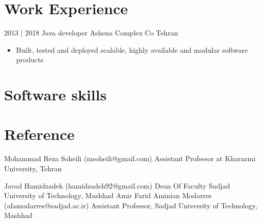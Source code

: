 \documentclass[letterpaper]{moderncv}        %
\begin{document}
\section{Work Experience}
\cventry
{2013 | 2018}
{Java developer}
{Ashena Complex Co}
{Tehran}
{}
{\begin{itemize}%
	\item Built, tested and deployed scalable, highly available and modular software products
	\end{itemize}}

\section{Software skills}


\section{Reference}

\cventry
{}
{Mohammad Reza Soheili}
{(msoheili@gmail.com)}
{}
{}
{Assistant Professor at Kharazmi University, Tehran}


\cventry
{}
{Javad Hamidzadeh}
{(hamidzadeh92@gmail.com)}
{}
{}
{Dean Of Faculty Sadjad University of Technology, Mashhad}
\cventry
{}
{Amir Farid Aminian Modarres}
{(afamodarres@sadjad.ac.ir)}
{}
{}
{Assistant Professor, Sadjad University of Technology, Mashhad}
\end{document}
